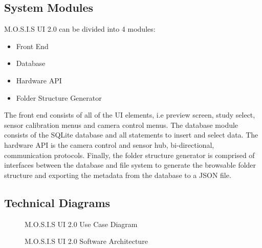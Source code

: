 \subsection{System Modules}
M.O.S.I.S UI 2.0 can be divided into 4 modules:
\begin{itemize}
	\item Front End
	\item Database
	\item Hardware API
	\item Folder Structure Generator
\end{itemize}
The front end consists of all of the UI elements, i.e preview screen, study select, sensor calibration menus and camera control menus.\cite{UnifiedModelingLanguage}
The database module consists of the SQLite database and all statements to insert and select data.\cite{kelechavaSQLStandardISO2018}\cite{UnifiedModelingLanguage} The hardware API is the camera control and sensor hub, bi-directional, communication protocols. Finally, the folder structure generator is comprised of interfaces between the database and file system to generate the browsable folder structure and exporting the metadata from the database to a JSON file.\cite{JPEGJPEG}\cite{JSON}
\subsection{Technical Diagrams}
\begin{center}
	\begin{figure}[H]
		\centering
		\caption*{M.O.S.I.S UI 2.0 Use Case Diagram}
	\end{figure}
	\begin{figure}[H]
		\caption*{M.O.S.I.S UI 2.0 Software Architecture}
	\end{figure}
\end{center}